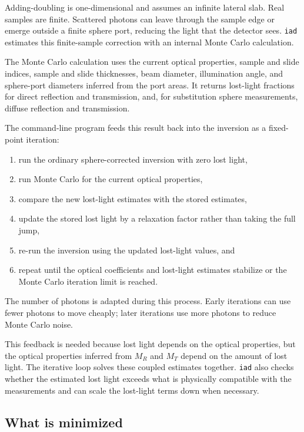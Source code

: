 \documentclass{article}
\newcommand\iadprog{\texttt{iad}}
\begin{document}
Adding-doubling is one-dimensional and assumes an infinite lateral slab.  Real
samples are finite.  Scattered photons can leave through the sample edge or
emerge outside a finite sphere port, reducing the light that the detector sees.
\iadprog{} estimates this finite-sample correction with an internal Monte Carlo
calculation.

The Monte Carlo calculation uses the current optical properties, sample and
slide indices, sample and slide thicknesses, beam diameter, illumination angle,
and sphere-port diameters inferred from the port areas.  It returns lost-light
fractions for direct reflection and transmission, and, for substitution sphere
measurements, diffuse reflection and transmission.

The command-line program feeds this result back into the inversion as a
fixed-point iteration:
\begin{enumerate}
\item run the ordinary sphere-corrected inversion with zero lost light,
\item run Monte Carlo for the current optical properties,
\item compare the new lost-light estimates with the stored estimates,
\item update the stored lost light by a relaxation factor rather than taking
      the full jump,
\item re-run the inversion using the updated lost-light values, and
\item repeat until the optical coefficients and lost-light estimates stabilize
      or the Monte Carlo iteration limit is reached.
\end{enumerate}
The number of photons is adapted during this process.  Early iterations can use
fewer photons to move cheaply; later iterations use more photons to reduce
Monte Carlo noise.

This feedback is needed because lost light depends on the optical properties,
but the optical properties inferred from $M_R$ and $M_T$ depend on the amount
of lost light.  The iterative loop solves these coupled estimates together.
\iadprog{} also checks whether the estimated lost light exceeds what is
physically compatible with the measurements and can scale the lost-light terms
down when necessary.

\subsection{What is minimized}
\end{document}
